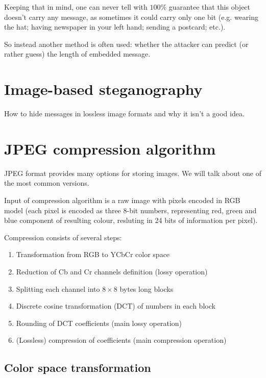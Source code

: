 Keeping that in mind, one can never tell with $100\%$
guarantee that this object doesn't carry any message, as sometimes it could carry only one bit 
(e.g. wearing the hat; having newspaper in your left hand; sending a postcard; etc.).

So instead another method is often used: whether the attacker can predict (or rather guess) the
length of embedded message.

\section{Image-based steganography}

How to hide messages in lossless image formats and why it isn't a good idea.

\section{JPEG compression algorithm}

JPEG format provides many options for storing images. We will talk about
one of the most common versions. %

Input of compression algorithm is a raw image with pixels encoded
in RGB model (each pixel is encoded as three 8-bit numbers, representing
red, green and blue component of resulting colour, resluting in 24 bits of information
per pixel).

Compression consists of several steps:
\begin{enumerate}
    \item Transformation from RGB to YCbCr color space
    \item Reduction of Cb and Cr channels definition (lossy operation)
    \item Splitting each channel into $8 \times 8$ bytes long blocks 
    \item Discrete cosine transformation (DCT) of numbers in each block
    \item Rounding of DCT coefficients (main lossy operation)
    \item (Lossless) compression of coefficients (main compression operation)
\end{enumerate}

\subsection{Color space transformation}

